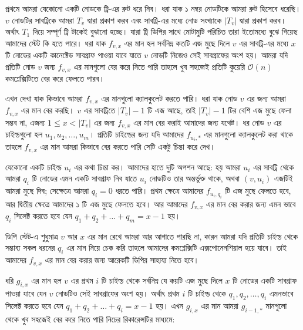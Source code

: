 প্রথমে আমরা যেকোনো একটি নোডকে ট্রি-এর রুট ধরে নিব। ধরা যাক ১ নম্বর নোডটিকে আমরা রুট হিসেবে ধরেছি। \(v\) নোডটির সাবট্রিকে আমরা \(T_{v}\) দ্বারা প্রকাশ করব এবং সাবট্রি-এর মধ্যে নোড সংখ্যাকে \(|T_{v}|\) দ্বারা প্রকাশ করব। অর্থাৎ \(T_{1}\) দিয়ে সম্পূর্ণ ট্রি টাকেই বুঝানো হচ্ছে। যারা ট্রি ডিপির সাথে মোটামুটি পরিচিত তারা ইতোমধ্যে বুঝে গিয়েছ আমাদের স্টেট কি হতে পারে। ধরা যাক \(f_{v, x}\) এর মান হল সর্বনিম্ন কতটি এজ মুছে দিলে \(v\) এর সাবট্রি-এর মধ্যে \(x\) টি নোডের একটি কানেক্টেড সাবগ্রাফ পাওয়া যাবে যাতে \(v\) নোডটি নিজেও সেই সাবগ্রাফের অংশ হয়। আমরা যদি প্রতিটি নোড \(v\) জন্য \(f_{v, x}\) এর মানগুলো বের করে নিতে পারি তাহলে খুব সহজেই প্রতিটি কুয়েরি \(\mathcal{O}(n)\) কমপ্লেক্সিটিতে বের করে ফেলতে পারব।

এখন দেখা যাক কিভাবে আমরা \(f_{v, x}\) এর মানগুলো ক্যালকুলেট করতে পারি। ধরা যাক নোড \(v\) এর জন্য আমরা \(f_{v, x}\) এর মান বের করছি। \(v\) এর সাবট্রিতে \(|T_{v}| - 1\) টি এজ আছে, তাই \(|T_{v}| - 1\)  টির বেশি এজ মুছে ফেলা সম্ভব না, এজন্য \(1 \leq x < |T_{v}|\) এর জন্য \(f_{v, x}\) এর মান বের করাই আমাদের জন্য যথেষ্ট। ধর নোড \(v\) এর চাইল্ডগুলো হল \(u_{1}, u_{2}, \dots , u_{m}\)। প্রতিটি চাইল্ডের জন্য যদি আমাদের \(f_{u_{i}, *}\) এর মানগুলো ক্যালকুলেট করা থাকে তাহলে \(f_{v, x}\) এর মান আমরা কিভাবে বের করতে পারি সেটি একটু চিন্তা করে দেখ।  

যেকোনো একটি চাইল্ড \(u_{i}\) এর কথা চিন্তা কর। আমাদের হাতে দুটি অপশন আছে: হয় আমরা \(u_{i}\) এর সাবট্রি থেকে আমরা \(q_{i}\) টি নোডের এমন একটি সাবগ্রাফ নিব যাতে \(u_{i}\) নোডটিও তার অন্তর্ভুক্ত থাকে, অথবা \(\left (v, u_{i} \right )\) এজটিই আমরা মুছে দিব; সেক্ষেত্রে আমরা \(q_{i} = 0\) ধরতে পারি। প্রথম ক্ষেত্রে আমাদের \(f_{u_{i}, q_{i}}\) টি এজ মুছে ফেলতে হবে, আর দ্বিতীয় ক্ষেত্রে আমাদের ১ টি এজ মুছে ফেলতে হবে। আর আমাদের \(f_{v, x}\) এর মান বের করার জন্য এমন ভাবে \(q_{i}\) সিলেক্ট করতে হবে যেন \(q_{1} + q_{2} + \dots + q_{m} = x - 1\) হয়।

ডিপি স্টেট-এ শুধুমাত্র \(v\) আর \(x\) এর মান রেখে আমরা আর আগাতে পারছি না, কারন আমরা যদি প্রতিটি চাইল্ড থেকে সম্ভাব্য সকল ধরনের \(q_{i}\) এর মান নিয়ে চেক করি তাহলে আমাদের কমপ্লেক্সিটি এক্সপোনেনশিয়াল হয়ে যাবে। তাই আমাদের \(f_{v, x}\) এর মান বের করার জন্য আরেকটি ডিপির সাহায্য নিতে হবে। 

ধরি \(g_{i, x}\) এর মান হল \(v\) এর প্রথম \(i\) টি চাইল্ড থেকে সর্বনিম্ন যে কয়টি এজ মুছে দিলে \(x\) টি নোডের একটি সাবগ্রাফ পাওয়া যাবে যেন \(v\) নোডটিও সেই সাবগ্রাফের অংশ হয়। অর্থাৎ প্রথম \(i\) টি চাইল্ড থেকে \(q_{1}, q_{2}, \dots , q_{i}\) এমনভাবে সিলেক্ট করতে হবে যেন \(q_{1} + q_{2} + \dots + q_{i} = x - 1\) হয়। এখন \(g_{i, x}\) এর মান আমরা \(g_{i - 1, *}\) মানগুলো থেকে খুব সহজেই বের করে নিতে পারি নিচের রিকারেন্সটির মাধ্যমে:

